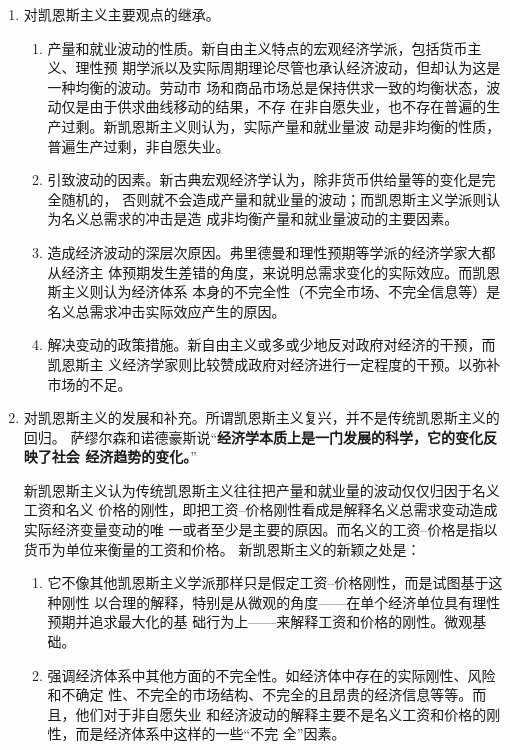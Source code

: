 \begin{enumerate}
\item 对凯恩斯主义主要观点的继承。
  \begin{enumerate}
  \item 产量和就业波动的性质。新自由主义特点的宏观经济学派，包括货币主义、理性预
    期学派以及实际周期理论尽管也承认经济波动，但却认为这是一种均衡的波动。劳动市
    场和商品市场总是保持供求一致的均衡状态，波动仅是由于供求曲线移动的结果，不存
    在非自愿失业，也不存在普遍的生产过剩。新凯恩斯主义则认为，实际产量和就业量波
    动是非均衡的性质，普遍生产过剩，非自愿失业。


  \item 引致波动的因素。新古典宏观经济学认为，除非货币供给量等的变化是完全随机的，
    否则就不会造成产量和就业量的波动；而凯恩斯主义学派则认为名义总需求的冲击是造
    成非均衡产量和就业量波动的主要因素。


  \item 造成经济波动的深层次原因。弗里德曼和理性预期等学派的经济学家大都从经济主
    体预期发生差错的角度，来说明总需求变化的实际效应。而凯恩斯主义则认为经济体系
    本身的不完全性（不完全市场、不完全信息等）是名义总需求冲击实际效应产生的原因。


  \item 解决变动的政策措施。新自由主义或多或少地反对政府对经济的干预，而凯恩斯主
    义经济学家则比较赞成政府对经济进行一定程度的干预。以弥补市场的不足。
  \end{enumerate}

\item 对凯恩斯主义的发展和补充。所谓凯恩斯主义复兴，并不是传统凯恩斯主义的回归。
  萨缪尔森和诺德豪斯说“\textbf{经济学本质上是一门发展的科学，它的变化反映了社会
    经济趋势的变化。}”

  新凯恩斯主义认为传统凯恩斯主义往往把产量和就业量的波动仅仅归因于名义工资和名义
  价格的刚性，即把工资--价格刚性看成是解释名义总需求变动造成实际经济变量变动的唯
  一或者至少是主要的原因。而名义的工资--价格是指以货币为单位来衡量的工资和价格。
  新凯恩斯主义的新颖之处是：
  \begin{enumerate}
  \item 它不像其他凯恩斯主义学派那样只是假定工资--价格刚性，而是试图基于这种刚性
    以合理的解释，特别是从微观的角度——在单个经济单位具有理性预期并追求最大化的基
    础行为上——来解释工资和价格的刚性。微观基础。

  \item 强调经济体系中其他方面的不完全性。如经济体中存在的实际刚性、风险和不确定
    性、不完全的市场结构、不完全的且昂贵的经济信息等等。而且，他们对于非自愿失业
    和经济波动的解释主要不是名义工资和价格的刚性，而是经济体系中这样的一些“不完
    全”因素。



\end{enumerate}
\end{enumerate}
